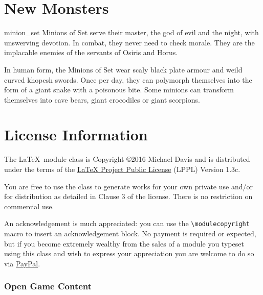 \documentclass[letterpaper,serif]{module}
\begin{document}
\lipsum[12-13]

\newpage

%
%

\part{New Monsters}


\begin{newmonster}{minion_set}\label{minion_set}%
Minions of Set serve their master, the god of evil and the night, with unswerving devotion. In combat, they
never need to check morale. They are the implacable enemies of the servants of Osiris and Horus.

In human form, the Minions of Set wear scaly black plate armour and weild curved khopesh swords. Once per
day, they can polymorph themselves into the form of a giant snake with a poisonous bite. Some minions can
transform themselves into cave bears, giant crocodiles or giant scorpions.
\end{newmonster}

\part{License Information}

The \LaTeX~module class is Copyright \copyright 2016 Michael Davis and is distributed under the terms of the
\href{http://www.latex-project.org/lppl.txt}{LaTeX Project Public License} (LPPL) Version 1.3c.

You are free to use the class to generate works for your own private use and/or for distribution as detailed in
Clause 3 of the license. There is no restriction on commercial use.

An acknowledgement is much appreciated: you can use the \verb|\modulecopyright| macro to insert an acknowledgement
block. No payment is required or expected, but if you become extremely wealthy from the sales of a module
you typeset using this class and wish to express your appreciation you are welcome to do so via
\href{https://paypal.me/slithy}{PayPal}.

%
%

\section{Open Game Content}
\label{ogl}
\end{document}
